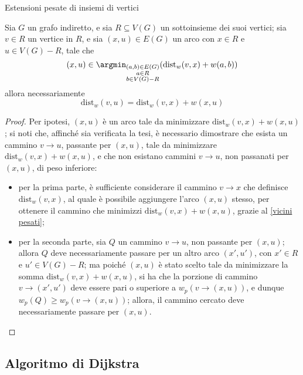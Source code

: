 \documentclass[a4paper, 12pt]{report}
\begin{document}
    \begin{framedthm}{Estensioni pesate di insiemi di vertici}
        \label{dijkstra theorem}

        Sia $G$ un grafo indiretto, e sia $R \subseteq V(G)$ un sottoinsieme dei suoi vertici; sia $v\in R$ un vertice in $R$, e sia $(x, u) \in E(G)$ un arco con $x \in R$ e $u \in V(G) - R$, tale che $$(x, u) \in \argmin_{\substack{(a, b) \in E(G) \\ a \in R \\ b \in V(G) - R}}{\left(\mathrm{dist}_w(v, x) + w(a, b)\right)}$$ allora necessariamente $$\mathrm{dist}_w(v, u) = \mathrm{dist}_w(v, x) + w(x, u)$$
    \end{framedthm}

    \begin{proof}
        Per ipotesi, $(x, u)$ è un arco tale da minimizzare $\mathrm{dist}_w(v, x) + w(x, u)$; si noti che, affinché sia verificata la tesi, è necessario dimostrare che esista un cammino $v \rightarrow u$, passante per $(x, u)$, tale da minimizzare $\mathrm{dist}_w(v, x) + w(x, u)$, e che non esistano cammini $v \rightarrow u$, non passanati per $(x, u)$, di peso inferiore:

        \begin{itemize}
            \item per la prima parte, è sufficiente considerare il cammino $v \rightarrow x$ che definisce $\mathrm{dist}_w(v, x)$, al quale è possibile aggiungere l'arco $(x, u)$ stesso, per ottenere il cammino che minimizzi $\mathrm{dist}_w(v, x) + w(x, u)$, grazie al \cref{vicini pesati};
            \item per la seconda parte, sia $Q$ un cammino $v \rightarrow u$, non passante per $(x, u)$; allora $Q$ deve necessariamente passare per un altro arco $(x', u')$, con $x' \in R$ e $u' \in V(G) - R$; ma poiché $(x, u)$ è stato scelto tale da minimizzare la somma $\mathrm{dist}_w(v, x) + w(x, u)$, si ha che la porzione di cammino $v \rightarrow (x', u')$ deve essere pari o superiore a $w_p\left(v \rightarrow (x, u)\right)$, e dunque $w_p(Q) \ge w_p(v \rightarrow (x, u))$; allora, il cammino cercato deve necessariamente passare per $(x, u)$.
        \end{itemize}
    \end{proof}

    \subsection{Algoritmo di Dijkstra}
\end{document}
